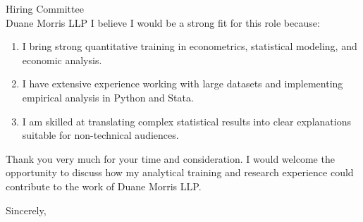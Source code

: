 \documentclass[11pt,letterpaper]{letter}
\begin{document}
\begin{letter}{
Hiring Committee \\
Duane Morris LLP
}
I believe I would be a strong fit for this role because:
\begin{enumerate}
\item I bring strong quantitative training in econometrics, statistical modeling, and economic analysis.
\item I have extensive experience working with large datasets and implementing empirical analysis in Python and Stata.
\item I am skilled at translating complex statistical results into clear explanations suitable for non-technical audiences.
\end{enumerate}

Thank you very much for your time and consideration. I would welcome the opportunity to discuss how my analytical training and research experience could contribute to the work of Duane Morris LLP.

\closing{Sincerely,}

\end{letter}
\end{document}
